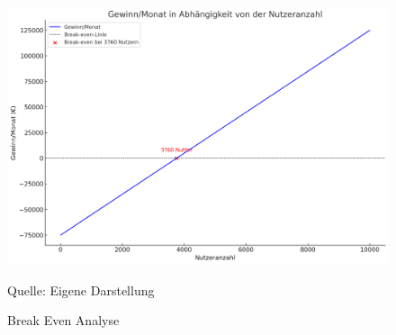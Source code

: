 \begin{figure}[htbp]
    \includegraphics[width=\textwidth, height=\textheight, keepaspectratio]{abbildungen/Break_Even}
    \caption{Break Even Analyse}
    \label{fig:BreakEven}
    \raggedright Quelle: Eigene Darstellung
\end{figure}